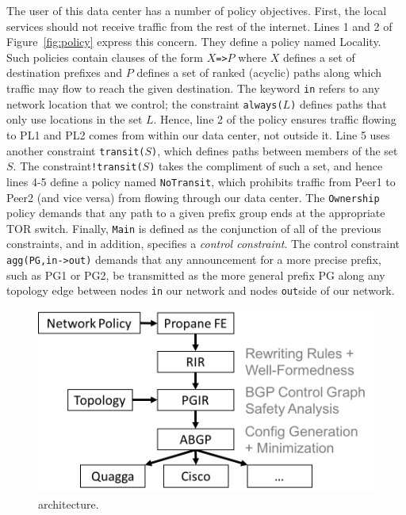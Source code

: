 The user of this data center has a number of policy objectives. First,
the local services should not receive traffic from the rest of the internet.  
Lines
1 and 2 of Figure~\ref{fig:policy} express this concern.  They define
a policy named Locality.  Such policies contain clauses of the form
\texttt{$X$=>$P$} where $X$ defines a set of destination prefixes and 
$P$ defines a set of ranked (acyclic) paths along which traffic may flow 
to reach the given destination.  The keyword \texttt{in} refers to
any network location that we control; the constraint \texttt{always($L$)}
defines paths that only use locations in the set $L$.  Hence, line 2
of the policy ensures traffic flowing to PL1 and PL2 comes from within
our data center, not outside it.  Line 5 uses another constraint
\texttt{transit($S$)}, which defines paths between members of the set $S$.
The constraint\texttt{!transit($S$)} takes the compliment of such a set,
and hence lines 4-5 define a policy named \texttt{NoTransit}, which prohibits
traffic from Peer1 to Peer2 (and vice versa) from flowing through our
data center.  The \texttt{Ownership} policy demands that any path
to a given prefix group ends at the appropriate TOR switch.  Finally,
\texttt{Main} is defined as the conjunction of all of the previous constraints,
and in addition, specifies a \emph{control constraint}.  The control
constraint \texttt{agg(PG,in->out)} demands that any announcement
for a more precise prefix, such as PG1 or PG2, be transmitted as the
more general prefix PG along any topology edge between nodes \texttt{in}
our network and nodes \texttt{out}side of our network.

%
\begin{figure}
  \centering
  \includegraphics[width=.45\textwidth]{figures/pipeline}
%
\caption{\Name architecture.
}
  \label{fig:pipeline}
  \vspace{-1em}
\end{figure}
%
